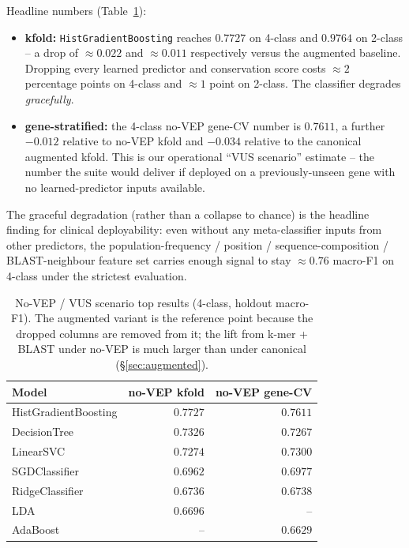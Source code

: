 \documentclass[11pt,a4paper]{article}
\begin{document}
Headline numbers (Table~\ref{tab:no-vep}):
\begin{itemize}[leftmargin=*]
    \item \textbf{kfold:} \texttt{HistGradientBoosting} reaches $0.7727$ on
          4-class and $0.9764$ on 2-class -- a drop of $\approx 0.022$
          and $\approx 0.011$ respectively versus the augmented baseline.
          Dropping every learned predictor and conservation score costs
          $\approx 2$ percentage points on 4-class and $\approx 1$ point on
          2-class. The classifier degrades \emph{gracefully}.
    \item \textbf{gene-stratified:} the 4-class no-VEP gene-CV number is
          $0.7611$, a further $-0.012$ relative to no-VEP kfold and $-0.034$
          relative to the canonical augmented kfold. This is our operational
          ``VUS scenario'' estimate -- the number the suite would deliver if
          deployed on a previously-unseen gene with no learned-predictor
          inputs available.
\end{itemize}
The graceful degradation (rather than a collapse to chance) is the headline
finding for clinical deployability: even without any meta-classifier
inputs from other predictors, the population-frequency / position /
sequence-composition / BLAST-neighbour feature set carries enough signal to
stay $\approx 0.76$ macro-F1 on 4-class under the strictest evaluation.

\begin{table}[H]
\centering
\caption{No-VEP / VUS scenario top results (4-class, holdout macro-F1).
The augmented variant is the reference point because the dropped columns
are removed from it; the lift from k-mer + BLAST under no-VEP is much
larger than under canonical (\S\ref{sec:augmented}).}
\label{tab:no-vep}
\small
\begin{tabular}{lrr}
\toprule
Model & no-VEP kfold & no-VEP gene-CV \\
\midrule
HistGradientBoosting & $0.7727$ & $0.7611$ \\
DecisionTree         & $0.7326$ & $0.7267$ \\
LinearSVC            & $0.7274$ & $0.7300$ \\
SGDClassifier        & $0.6962$ & $0.6977$ \\
RidgeClassifier      & $0.6736$ & $0.6738$ \\
LDA                  & $0.6696$ & --       \\
AdaBoost             & --       & $0.6629$ \\
\bottomrule
\end{tabular}
\end{table}
\end{document}
